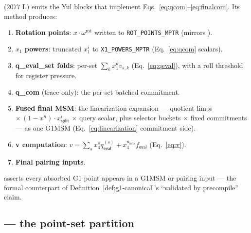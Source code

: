  (2077 L) emits the Yul blocks that implement
Eqs.~\eqref{eq:qcom}--\eqref{eq:finalcom}. Its 
method produces:
\begin{enumerate}[leftmargin=1.4em,itemsep=1pt]
  \item \textbf{Rotation points}: $x\cdot\omega^{\text{rot}}$ written to
        \texttt{ROT\_POINTS\_MPTR} (mirrors ).
  \item \textbf{$x_1$ powers}: truncated $x_1^i$ to
        \texttt{X1\_POWERS\_MPTR} (Eq.~\eqref{eq:qcom} scalars).
  \item \textbf{q\_eval\_set folds}: per-set $\sum_k x_1^k v_{s,k}$
        (Eq.~\eqref{eq:qeval}), with a roll threshold
         for register pressure.
  \item \textbf{q\_com} (trace-only): the per-set batched commitment.
  \item \textbf{Fused final MSM}: the linearization expansion ---
        quotient limbs $\times\,(1-x^n)\cdot x_{\mathsf{split}}^i$
        $\times$ query scalar, plus selector buckets $\times$ fixed
        commitments --- as one G1MSM (Eq.~\eqref{eq:linearization}
        commitment side).
  \item \textbf{v computation}: $v = \sum_s x_4^s q_{\mathsf{eval}}^{(s)}
        + x_4^{n_{\text{sets}}} f_{\mathsf{eval}}$ (Eq.~\eqref{eq:v}).
  \item \textbf{Final pairing inputs}.
\end{enumerate}
 asserts every absorbed G1 point
appears in a G1MSM or pairing input --- the formal counterpart of
Definition~\ref{def:g1-canonical}'s ``validated by precompile'' claim.

\subsection{ --- the point-set partition}
\label{sec:construct-sets}

